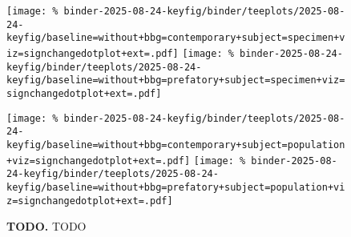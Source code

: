 \begin{figure*}


\texttt{[image: \%
binder-2025-08-24-keyfig/binder/teeplots/2025-08-24-keyfig/baseline=without+bbg=contemporary+subject=specimen+viz=signchangedotplot+ext=.pdf]}%
\texttt{[image: \%
binder-2025-08-24-keyfig/binder/teeplots/2025-08-24-keyfig/baseline=without+bbg=prefatory+subject=specimen+viz=signchangedotplot+ext=.pdf]}

\texttt{[image: \%
binder-2025-08-24-keyfig/binder/teeplots/2025-08-24-keyfig/baseline=without+bbg=contemporary+subject=population+viz=signchangedotplot+ext=.pdf]}%
\texttt{[image: \%
binder-2025-08-24-keyfig/binder/teeplots/2025-08-24-keyfig/baseline=without+bbg=prefatory+subject=population+viz=signchangedotplot+ext=.pdf]}

\vspace{-1ex}

\caption{
\textbf{TODO.}
TODO
}
\label{fig:sign-change}

\end{figure*}
